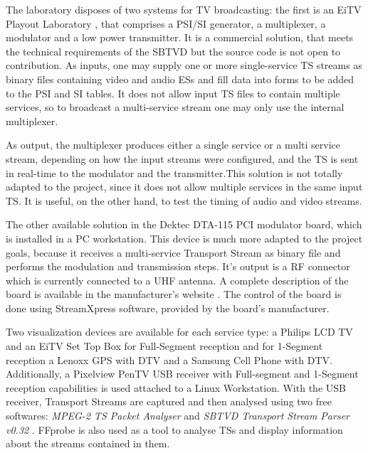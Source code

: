 \documentclass[
	12pt,				%
	openright,			%
	twoside,			%
	a4paper,			%
	brazil,
	french,				%
	english
	]{abntex2}
\begin{document}
The laboratory disposes of two systems for TV broadcasting: the first is an EiTV Playout Laboratory \cite{eitv}, that comprises a PSI/SI generator, a multiplexer, a modulator and a low power transmitter. It is a commercial solution, that meets the technical requirements of the SBTVD but the source code is not open to contribution. As inputs, one may supply one or more single-service TS streams as binary files containing video and audio ESs and fill data into forms to be added to the PSI and SI tables. It does not allow input TS files to contain multiple services, so to broadcast a multi-service stream one may only use the internal multiplexer.

As output, the multiplexer produces either a single service or a multi service stream, depending on how the input streams were configured, and the TS is sent in real-time to the modulator and the transmitter.This solution is not totally adapted to the project, since it does not allow multiple services in the same input TS. It is useful, on the other hand, to test the timing of audio and video streams.

The other available solution in the Dektec DTA-115 PCI modulator board, which is installed in a PC workstation. This device is much more adapted to the project goals, because it receives a multi-service Transport Stream as binary file and performs the modulation and transmission steps. It's output is a RF connector which is currently connected to a  UHF antenna. A complete description of the board is available in the manufacturer's website \cite{dektec}. The control of the board is done using StreamXpress software, provided by the board's manufacturer.


Two visualization devices are available for each service type: a Philips LCD TV and an EiTV Set Top Box for Full-Segment reception and for 1-Segment reception a Lenoxx GPS with DTV and a Samsung Cell Phone with DTV. Additionally, a Pixelview PenTV USB receiver with Full-segment and 1-Segment reception capabilities is used attached to a Linux Workstation. With the USB receiver, Transport Streams are captured and then analysed using two free softwares: \textit{MPEG-2 TS Packet Analyser} \cite{} and \textit{SBTVD Transport Stream Parser v0.32} \cite{}. FFprobe is also used as a tool to analyse TSs and display information about the streams contained in them.
\end{document}
